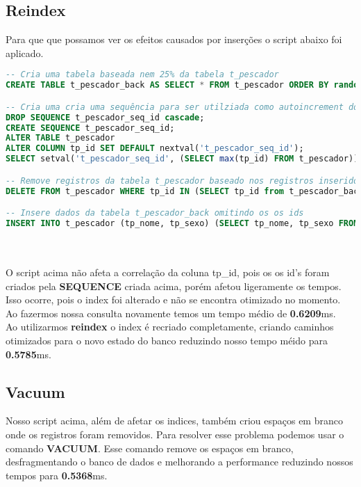 \documentclass[12pt, a4paper, twoside, titlepage]{article}
\begin{document}
\subsection{Reindex}
Para que que possamos ver os efeitos causados por inserções o script abaixo foi aplicado.
\begin{lstlisting}[language=SQL]
-- Cria uma tabela baseada nem 25% da tabela t_pescador
CREATE TABLE t_pescador_back AS SELECT * FROM t_pescador ORDER BY random() limit (SELECT (count(*)*0.25)::INTEGER FROM t_pescador);

-- Cria uma cria uma sequência para ser utilziada como autoincrement do tp_id e evitar que na inserção, o banco coloque os dados no mesmo lugar onde eles se encontravam.
DROP SEQUENCE t_pescador_seq_id cascade;
CREATE SEQUENCE t_pescador_seq_id;
ALTER TABLE t_pescador
ALTER COLUMN tp_id SET DEFAULT nextval('t_pescador_seq_id');
SELECT setval('t_pescador_seq_id', (SELECT max(tp_id) FROM t_pescador));

-- Remove registros da tabela t_pescador baseado nos registros inseridos na tabela t_pescador_back;
DELETE FROM t_pescador WHERE tp_id IN (SELECT tp_id from t_pescador_back);

-- Insere dados da tabela t_pescador_back omitindo os os ids 
INSERT INTO t_pescador (tp_nome, tp_sexo) (SELECT tp_nome, tp_sexo FROM t_pescador_back)
\end{lstlisting}
\\\\O script acima não afeta a correlação da coluna tp\_id, pois os os id's foram criados pela \textbf{SEQUENCE} criada acima, porém afetou ligeramente os tempos. Isso ocorre, pois o index foi alterado e não se encontra otimizado no momento. 
Ao fazermos nossa consulta novamente temos um tempo médio de \textbf{0.6209}ms.
\\Ao utilizarmos \textbf{reindex} o index é recriado completamente, criando caminhos otimizados para o novo estado do banco reduzindo nosso tempo méido para \textbf{0.5785}ms.
\subsection{Vacuum}
Nosso script acima, além de afetar os indices, também criou espaços em branco onde os registros foram removidos. Para resolver esse problema podemos usar o comando \textbf{VACUUM}. Esse comando remove os espaços em branco, desfragmentando o banco de dados e melhorando a performance reduzindo nossos tempos para \textbf{0.5368}ms.
\clearpage
\end{document}
